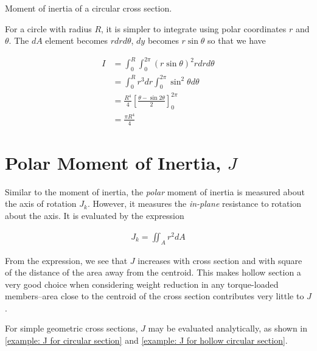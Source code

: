 \documentclass[
10pt,
a4paper,
openany,
svgnames,
]{book}
\begin{document}
\begin{example} \label{example: moment of inertia of circle} Moment of inertia of a circular cross section.

  For a circle with radius $R$, it is simpler to integrate using polar coordinates $r$ and $\theta$. The $dA$ element becomes $rdrd\theta$, $dy$ becomes $r \sin \theta$ so that we have

  \begin{align*}
    I &= \int_0^R \int_0^{2\pi} \left( r \sin \theta \right)^2 r dr d\theta \\
      &= \int_0^R r^3 dr \int_0^{2\pi} \sin^2 \theta d\theta \\
      &= \frac{R^4}{4} \left[ \frac{\theta - \sin 2\theta}{2} \right]_0^{2\pi} \\
      &= \frac{\pi R^4}{4}
  \end{align*}

\end{example}

\section{Polar Moment of Inertia, $J$}

Similar to the moment of inertia, the \emph{polar} moment of inertia is measured about the axis of rotation $J_k$. However, it measures the \emph{in-plane} resistance to rotation about the axis. It is evaluated by the expression

\begin{align}
  J_k = \iint_A r^2dA
\end{align}

From the expression, we see that $J$ increases with cross section and with square of the distance of the area away from the centroid. This makes hollow section a very good choice when considering weight reduction in any torque-loaded members--area close to the centroid of the cross section contributes very little to $J$.

For simple geometric cross sections, $J$ may be evaluated analytically, as shown in \cref{example: J for circular section} and \cref{example: J for hollow circular section}.
\end{document}
